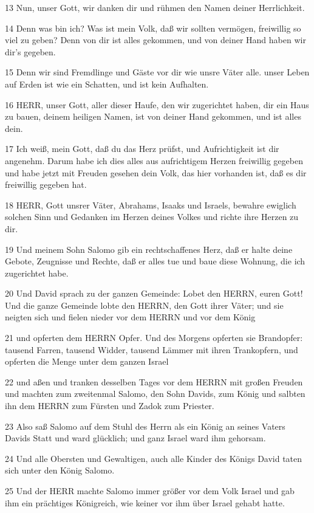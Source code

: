 \par 13 Nun, unser Gott, wir danken dir und rühmen den Namen deiner Herrlichkeit.
\par 14 Denn was bin ich? Was ist mein Volk, daß wir sollten vermögen, freiwillig so viel zu geben? Denn von dir ist alles gekommen, und von deiner Hand haben wir dir's gegeben.
\par 15 Denn wir sind Fremdlinge und Gäste vor dir wie unsre Väter alle. unser Leben auf Erden ist wie ein Schatten, und ist kein Aufhalten.
\par 16 HERR, unser Gott, aller dieser Haufe, den wir zugerichtet haben, dir ein Haus zu bauen, deinem heiligen Namen, ist von deiner Hand gekommen, und ist alles dein.
\par 17 Ich weiß, mein Gott, daß du das Herz prüfst, und Aufrichtigkeit ist dir angenehm. Darum habe ich dies alles aus aufrichtigem Herzen freiwillig gegeben und habe jetzt mit Freuden gesehen dein Volk, das hier vorhanden ist, daß es dir freiwillig gegeben hat.
\par 18 HERR, Gott unsrer Väter, Abrahams, Isaaks und Israels, bewahre ewiglich solchen Sinn und Gedanken im Herzen deines Volkes und richte ihre Herzen zu dir.
\par 19 Und meinem Sohn Salomo gib ein rechtschaffenes Herz, daß er halte deine Gebote, Zeugnisse und Rechte, daß er alles tue und baue diese Wohnung, die ich zugerichtet habe.
\par 20 Und David sprach zu der ganzen Gemeinde: Lobet den HERRN, euren Gott! Und die ganze Gemeinde lobte den HERRN, den Gott ihrer Väter; und sie neigten sich und fielen nieder vor dem HERRN und vor dem König
\par 21 und opferten dem HERRN Opfer. Und des Morgens opferten sie Brandopfer: tausend Farren, tausend Widder, tausend Lämmer mit ihren Trankopfern, und opferten die Menge unter dem ganzen Israel
\par 22 und aßen und tranken desselben Tages vor dem HERRN mit großen Freuden und machten zum zweitenmal Salomo, den Sohn Davids, zum König und salbten ihn dem HERRN zum Fürsten und Zadok zum Priester.
\par 23 Also saß Salomo auf dem Stuhl des Herrn als ein König an seines Vaters Davids Statt und ward glücklich; und ganz Israel ward ihm gehorsam.
\par 24 Und alle Obersten und Gewaltigen, auch alle Kinder des Königs David taten sich unter den König Salomo.
\par 25 Und der HERR machte Salomo immer größer vor dem Volk Israel und gab ihm ein prächtiges Königreich, wie keiner vor ihm über Israel gehabt hatte.
